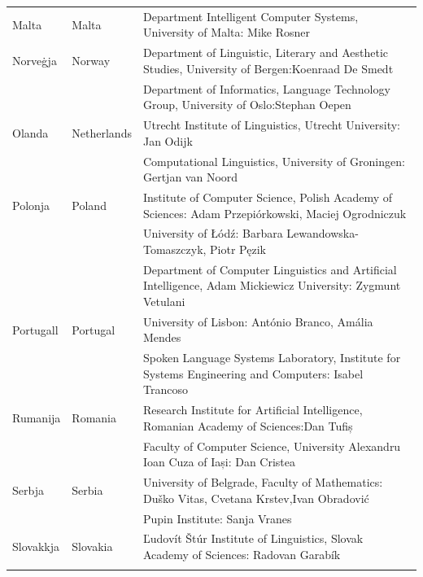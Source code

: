 \begin{longtable}{@{}llp{113mm}@{}}
  Malta & \textcolor{grey1}{Malta} & Department Intelligent Computer Systems, University of Malta: Mike Rosner\\ \addlinespace
  Norveġja & \textcolor{grey1}{Norway} & Department of Linguistic, Literary and Aesthetic Studies, University of Bergen:\newline Koenraad De Smedt\\ \addlinespace 
  & & Department of Informatics, Language Technology Group, University of Oslo:\newline Stephan Oepen \\ \addlinespace
  Olanda & \textcolor{grey1}{Netherlands} & Utrecht Institute of Linguistics, Utrecht University: Jan Odijk\\ \addlinespace 
  & & Computational Linguistics, University of Groningen: Gertjan van Noord\\ \addlinespace
  Polonja & \textcolor{grey1}{Poland} & Institute of Computer Science, Polish Academy of Sciences: Adam Przepiórkowski, Maciej Ogrodniczuk \\ \addlinespace
  & & University of Łódź: Barbara Lewandowska-Tomaszczyk, Piotr Pęzik\\ \addlinespace
  & & Department of Computer Linguistics and Artificial Intelligence, Adam Mickiewicz University: Zygmunt Vetulani \\ \addlinespace
  Portugall & \textcolor{grey1}{Portugal} & University of Lisbon: António Branco, Amália Mendes \\ \addlinespace
  & & Spoken Language Systems Laboratory, Institute for Systems Engineering and Computers: Isabel Trancoso \\ \addlinespace
  Rumanija & \textcolor{grey1}{Romania} & Research Institute for Artificial Intelligence, Romanian Academy of Sciences:\newline Dan Tufiș \\ \addlinespace
  & & Faculty of Computer Science, University Alexandru Ioan Cuza of Iași: Dan Cristea \\ \addlinespace
  Serbja & \textcolor{grey1}{Serbia} & University of Belgrade, Faculty of Mathematics: Duško Vitas, Cvetana Krstev,\newline Ivan Obradović \\ \addlinespace
  & & Pupin Institute: Sanja Vranes \\ \addlinespace  
  Slovakkja & \textcolor{grey1}{Slovakia} & Ľudovít Štúr Institute of Linguistics, Slovak Academy of Sciences: Radovan Garabík \\ \addlinespace 

\end{longtable}
